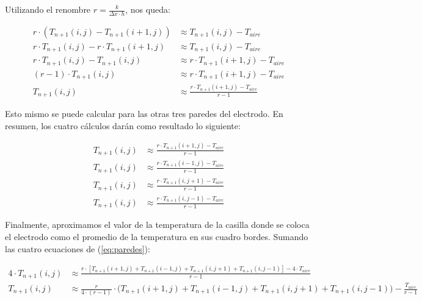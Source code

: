 \documentclass[a4paper]{article}
\begin{document}
Utilizando el renombre $r = \frac{k}{\Delta x \cdot h}$, nos queda:

\begin{equation*}
\begin{aligned}
r \cdot (T_{n+1}(i,j) - T_{n+1}(i+1,j)) & \approx T_{n+1}(i,j) - T_{aire} \\
r \cdot T_{n+1}(i,j) - r \cdot T_{n+1}(i+1,j) & \approx T_{n+1}(i,j) - T_{aire} \\
r \cdot T_{n+1}(i,j) - T_{n+1}(i,j) & \approx r \cdot T_{n+1}(i+1,j) - T_{aire} \\
(r - 1) \cdot T_{n+1}(i,j) & \approx r \cdot T_{n+1}(i+1,j) - T_{aire} \\
T_{n+1}(i,j) & \approx \frac{r \cdot T_{n+1}(i+1,j) - T_{aire}}{r-1}
\end{aligned}
\end{equation*}

Esto mismo se puede calcular para las otras tres paredes del electrodo. En resumen, los cuatro cálculos darán como resultado lo siguiente:

\begin{equation*} \label{eq:paredes}
\begin{aligned}
T_{n+1}(i,j) & \approx \frac{r \cdot T_{n+1}(i+1,j) - T_{aire}}{r-1} \\
T_{n+1}(i,j) & \approx \frac{r \cdot T_{n+1}(i-1,j) - T_{aire}}{r-1} \\
T_{n+1}(i,j) & \approx \frac{r \cdot T_{n+1}(i,j+1) - T_{aire}}{r-1} \\
T_{n+1}(i,j) & \approx \frac{r \cdot T_{n+1}(i,j-1) - T_{aire}}{r-1}
\end{aligned}
\end{equation*}

Finalmente, aproximamos el valor de la temperatura de la casilla donde se coloca el electrodo como el promedio de la temperatura en sus cuadro bordes. Sumando las cuatro ecuaciones de (\ref{eq:paredes}):

\begin{equation*}
\begin{aligned}
4 \cdot T_{n+1}(i,j) & \approx \frac{r \cdot [T_{n+1}(i+1,j) + T_{n+1}(i-1,j) + T_{n+1}(i,j+1) + T_{n+1}(i,j-1)] - 4 \cdot T_{aire}}{r-1} \\
T_{n+1}(i,j) & \approx \frac{r}{4 \cdot (r-1)} \cdot \big(T_{n+1}(i+1,j) + T_{n+1}(i-1,j) + T_{n+1}(i,j+1) + T_{n+1}(i,j-1)\big) - \frac{T_{aire}}{r-1}
\end{aligned}
\end{equation*}
\end{document}
